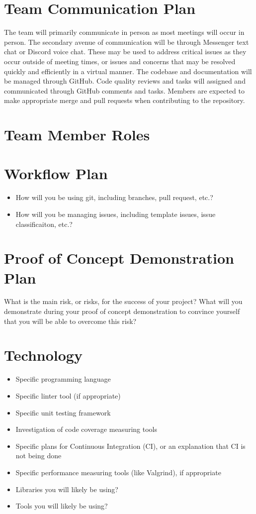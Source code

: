 \documentclass{article}
\begin{document}
\section{Team Communication Plan}

	The team will primarily communicate in person as most meetings will occur in person. The secondary avenue of communication will be through Messenger text chat or Discord voice chat. These may be used to address critical issues as they occur outside of meeting times, or issues and concerns that may be resolved quickly and efficiently in a virtual manner. The codebase and documentation will be managed through GitHub. Code quality reviews and tasks will assigned and communicated through GitHub comments and tasks. Members are expected to make appropriate merge and pull requests when contributing to the repository.

\section{Team Member Roles}

\section{Workflow Plan}

\begin{itemize}
	\item How will you be using git, including branches, pull request, etc.?
	\item How will you be managing issues, including template issues, issue
	classificaiton, etc.?
\end{itemize}

\section{Proof of Concept Demonstration Plan}

What is the main risk, or risks, for the success of your project?  What will you
demonstrate during your proof of concept demonstration to convince yourself that
you will be able to overcome this risk?

\section{Technology}

\begin{itemize}
\item Specific programming language
\item Specific linter tool (if appropriate)
\item Specific unit testing framework
\item Investigation of code coverage measuring tools
\item Specific plans for Continuous Integration (CI), or an explanation that CI
  is not being done
\item Specific performance measuring tools (like Valgrind), if
  appropriate
\item Libraries you will likely be using?
\item Tools you will likely be using?
\end{itemize}
\end{document}
